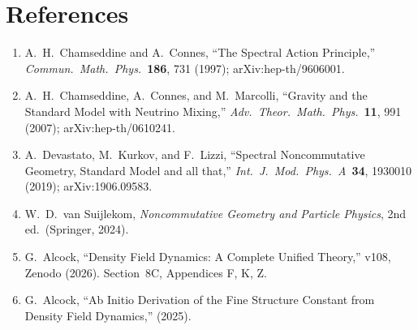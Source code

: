 \documentclass[12pt,a4paper]{article}
\begin{document}
\section*{References}

\begin{enumerate}
\item[{[1]}] A.~H.~Chamseddine and A.~Connes, ``The Spectral Action Principle,''
  \textit{Commun.\ Math.\ Phys.}\ \textbf{186}, 731 (1997);
  arXiv:hep-th/9606001.

\item[{[2]}] A.~H.~Chamseddine, A.~Connes, and M.~Marcolli, ``Gravity and the
  Standard Model with Neutrino Mixing,'' \textit{Adv.\ Theor.\ Math.\ Phys.}\
  \textbf{11}, 991 (2007); arXiv:hep-th/0610241.

\item[{[3]}] A.~Devastato, M.~Kurkov, and F.~Lizzi, ``Spectral Noncommutative
  Geometry, Standard Model and all that,'' \textit{Int.\ J.\ Mod.\ Phys.\ A}\
  \textbf{34}, 1930010 (2019); arXiv:1906.09583.

\item[{[4]}] W.~D.~van Suijlekom, \textit{Noncommutative Geometry and Particle
  Physics}, 2nd ed.\ (Springer, 2024).

\item[{[5]}] G.~Alcock, ``Density Field Dynamics: A Complete Unified Theory,''
  v108, Zenodo (2026).  Section~8C, Appendices F, K, Z.

\item[{[6]}] G.~Alcock, ``Ab Initio Derivation of the Fine Structure Constant
  from Density Field Dynamics,'' (2025).
\end{enumerate}
\end{document}
